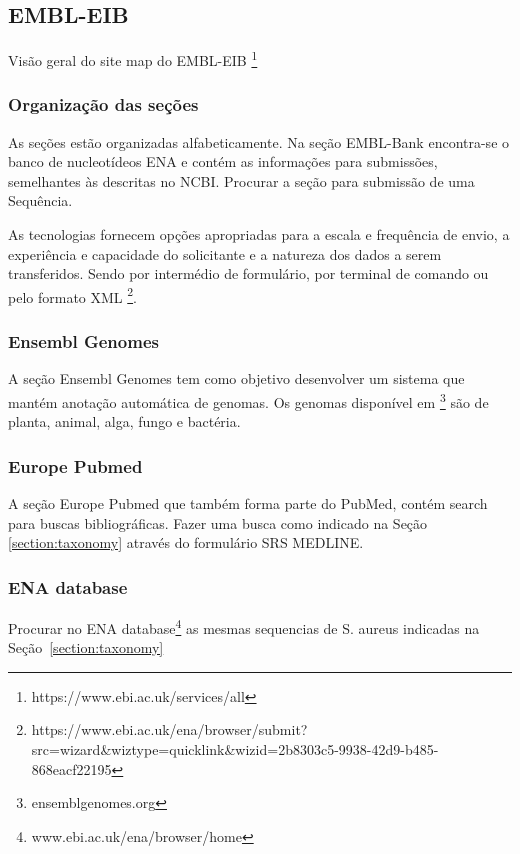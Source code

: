 \subsection{EMBL-EIB}

Visão geral do site map do EMBL-EIB \footnote{https://www.ebi.ac.uk/services/all}


\subsubsection{Organização das seções}
As seções estão organizadas alfabeticamente. 
Na seção EMBL-Bank encontra-se o banco de nucleotídeos ENA e contém as informações para submissões, semelhantes às descritas no NCBI. Procurar a seção para submissão de uma Sequência.

As tecnologias fornecem opções apropriadas para a escala e frequência de envio, a experiência e capacidade do solicitante e a natureza dos dados a serem transferidos.
Sendo por intermédio de formulário, por terminal de comando ou pelo formato XML
\footnote{https://www.ebi.ac.uk/ena/browser/submit?src=wizard\&wiztype=quicklink\&wizid=2b8303c5-9938-42d9-b485-868eacf22195}.


\subsubsection{Ensembl Genomes}
A seção Ensembl Genomes tem como objetivo desenvolver um sistema que mantém anotação automática de genomas. 
Os genomas disponível em \footnote{ensemblgenomes.org} são de planta, animal, alga, fungo e bactéria. 


\subsubsection{Europe Pubmed}
A seção Europe Pubmed que também forma parte do PubMed, contém search para buscas bibliográficas. Fazer uma busca como indicado na Seção \ref{section:taxonomy} através do formulário SRS MEDLINE.

\subsubsection{ENA database}
Procurar no ENA database\footnote{www.ebi.ac.uk/ena/browser/home} as mesmas sequencias de S. aureus indicadas na Seção~\ref{section:taxonomy}